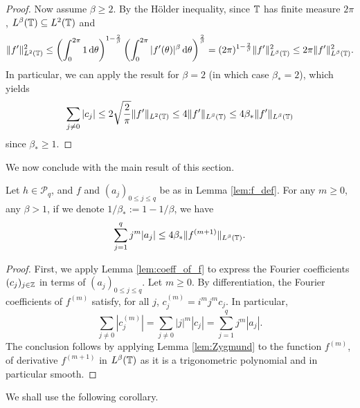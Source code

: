 \begin{proof}
  Now assume $\beta \geq 2$.
  By the H\"older inequality, since $\mathbb{T}$ has finite measure $2 \pi$,
  $L^\beta(\mathbb{T}) \subseteq L^2(\mathbb{T})$ and
  \begin{equation*}
    \|f'\|_{L^2(\mathbb{T})}^2
   \leq  \left(\int_0^{2 \pi} 1 \, \mathrm{d} \theta\right)^{1-\frac{2}{\beta}}
    \left(\int_0^{2 \pi} |f'(\theta)|^{\beta} \, \mathrm{d} \theta\right)^{\frac{2}{\beta}}
    = (2 \pi)^{1-\frac{2}{\beta}}  \|f'\|_{L^\beta(\mathbb{T})}^2
    \leq 2 \pi \|f'\|_{L^\beta(\mathbb{T})}^2.
  \end{equation*}
  In particular, we can apply the result for $\beta=2$ (in which case $\beta_*=2$),
  which yields
  \begin{equation*}
    \sum_{j \neq 0} |c_j|
    \leq 2 \sqrt{\frac{2}{\pi}}  \|f'\|_{L^2(\mathbb{T})}
    \leq 4 \|f'\|_{L^\beta(\mathbb{T})}
    \leq 4 \beta_*  \|f'\|_{L^\beta(\mathbb{T})}
  \end{equation*}
  since $\beta_* \geq 1$.
\end{proof}

We now conclude with the main result of this section.

\begin{lemma}
  \label{lem:bound_sum_aj}
  Let $h \in \mathcal{P}_q$, and $f$ and $(a_j)_{0 \leq j \leq q}$ be as in Lemma \ref{lem:f_def}.
  For any $m \geq 0$,
  any $\beta > 1$, if we denote $1/\beta_* := 1 - 1/\beta$, we have
  \begin{equation*}
    \sum_{j=1}^q j^m |a_j| \leq 4 \beta_* \|f^{(m+1)}\|_{L^\beta(\mathbb{T})}.
  \end{equation*}
\end{lemma}

\begin{proof}
  First, we apply Lemma \ref{lem:coeff_of_f} to express the Fourier coefficients
  $(c_j)_{j \in \mathbb{Z}}$ in terms of $(a_j)_{0 \leq j \leq q}$.
  Let $m \geq 0$. By differentiation,
  the Fourier coefficients of $f^{(m)}$ satisfy, for
  all $j$, $c_j^{(m)} =
    i^m j^m c_j$.
  In particular,
  \begin{equation*}
    \sum_{j \neq 0} |c_j^{(m)}|
    = \sum_{j \neq 0} |j|^m |c_j|
    = \sum_{j =1}^q j^m |a_j|.
  \end{equation*}
  The conclusion follows by applying Lemma \ref{lem:Zygmund} to the function $f^{(m)}$,
  of derivative $f^{(m+1)}$ in $L^\beta(\mathbb{T})$ as it is a trigonometric polynomial and in particular smooth.
\end{proof}

We shall use the following corollary.

